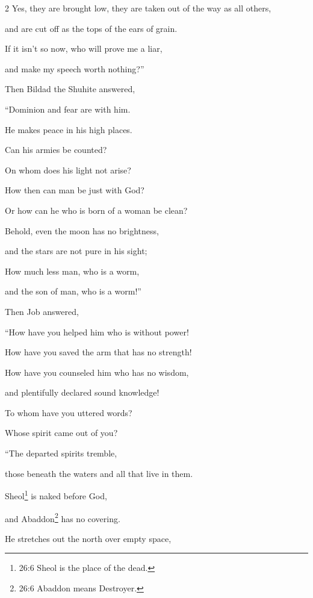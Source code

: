 \begin{multicols}{2}
	Yes, they are brought low, they are taken out of the way as all others,
	
	and are cut off as the tops of the ears of grain.
	
	\myverse{}If it isn’t so now, who will prove me a liar,
	
	and make my speech worth nothing?”
	
	
	\mychapter{} \myverse*{}Then Bildad the Shuhite answered,
	
\quad\quad	\myverse{}“Dominion and fear are with him.
	
	He makes peace in his high places.
	
	\myverse{}Can his armies be counted?
	
	On whom does his light not arise?
	
	\myverse{}How then can man be just with God?
	
	Or how can he who is born of a woman be clean?
	
	\myverse{}Behold, even the moon has no brightness,
	
	and the stars are not pure in his sight;
	
	\myverse{}How much less man, who is a worm,
	
	and the son of man, who is a worm!”
	
	
	\mychapter{} \myverse*{}Then Job answered,
	
	\quad\quad \myverse{}“How have you helped him who is without power!
	
	How have you saved the arm that has no strength!
	
	\myverse{}How have you counseled him who has no wisdom,
	
	and plentifully declared sound knowledge!
	
	\myverse{}To whom have you uttered words?
	
	Whose spirit came out of you?
	
		\vspace{\baselineskip}
	
	\myverse{}“The departed spirits tremble,
	
	those beneath the waters and all that live in them.
	
	\myverse{}Sheol\footnote{26:6 Sheol is the place of the dead.} is naked before God,
	
	and Abaddon\footnote{26:6 Abaddon means Destroyer.} has no covering.
	
	\myverse{}He stretches out the north over empty space,
	

\end{multicols}
